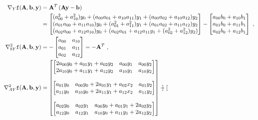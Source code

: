 \begin{align}
\nabla_Y \texttt{f}(\mb{A}, \mb{b}, \mb{y})
&= \mb{A}^T \left( \mb{A} \mb{y} - \mb{b} \right) \nonumber \\
&=
\begin{bmatrix}
(a_{00}^2 + a_{10}^2) y_0 + (a_{00} a_{01} + a_{10} a_{11}) y_1 + (a_{00} a_{02} + a_{10} a_{12}) y_2 \\
(a_{01} a_{00} + a_{11} a_{10}) y_0 + (a_{01}^2 + a_{11}^2) y_1 + (a_{01} a_{02} + a_{11} a_{12}) y_2 \\
(a_{02} a_{00} + a_{12} a_{10}) y_0 + (a_{02} a_{01} + a_{12} a_{11} y_1 + (a_{02}^2 + a_{12}^2) y_2)
\end{bmatrix}
-
\begin{bmatrix}
a_{00} b_0+ a_{10} b_1 \\
a_{01} b_0 + a_{11} b_1 \\
a_{02} b_0 + a_{12} b_1
\end{bmatrix}\ ,\\
\nabla^2_{bY} \texttt{f}(\mb{A}, \mb{b}, \mb{y})
&=
-\begin{bmatrix}
a_{00} & a_{10} \\
a_{01} & a_{11} \\
a_{02} & a_{12}
\end{bmatrix}
=-\mb{A}^T\ , \\
\nabla^2_{AY} \texttt{f}(\mb{A}, \mb{b}, \mb{y})
&=
\begin{bmatrix}
\begin{bmatrix}
2a_{00} y_0 + a_{01} y_1 + a_{02} y_2 & a_{00} y_1 & a_{00} y_2 \\
2a_{10} y_0 + a_{11} y_1 + a_{12} y_2 & a_{10} y_1 & a_{10} y_2
\end{bmatrix} \\ \\
%
\begin{bmatrix}
a_{01} y_0 & a_{00} y_0 + 2a_{01} y_1 + a_{02} x_2 & a_{01} y_2 \\
a_{11} y_0 & a_{10} y_0 + 2a_{11} y_1 + a_{12} x_2 &  a_{11} y_2
\end{bmatrix} \\ \\
%
\begin{bmatrix}
a_{02} y_0 & a_{02} y_1 & a_{00} y_0 + a_{01} y_1 + 2a_{02} y_2 \\
a_{12} y_0 & a_{12} y_1 & a_{10} y_0 + a_{11} y_1 + 2a_{12} y_2
\end{bmatrix}
\end{bmatrix}
-
\begin{bmatrix}

\end{bmatrix}
\end{align}
